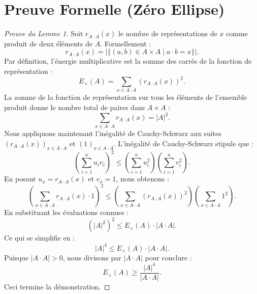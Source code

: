\documentclass[11pt,a4paper]{article}
\begin{document}
\section{Preuve Formelle (Zéro Ellipse)}
\begin{proof}[Preuve du Lemme 1]
Soit $r_{A \cdot A}(x)$ le nombre de représentations de $x$ comme produit de deux éléments de $A$. Formellement :
\begin{equation}
r_{A \cdot A}(x) = |\{(a,b) \in A \times A \mid a \cdot b = x\}|.
\end{equation}
Par définition, l'énergie multiplicative est la somme des carrés de la fonction de représentation :
\begin{equation}
E_{\times}(A) = \sum_{x \in A \cdot A} (r_{A \cdot A}(x))^2.
\end{equation}
La somme de la fonction de représentation sur tous les éléments de l'ensemble produit donne le nombre total de paires dans $A \times A$ :
\begin{equation}
\sum_{x \in A \cdot A} r_{A \cdot A}(x) = |A|^2.
\end{equation}
Nous appliquons maintenant l'inégalité de Cauchy-Schwarz aux suites $(r_{A \cdot A}(x))_{x \in A \cdot A}$ et $(1)_{x \in A \cdot A}$.
L'inégalité de Cauchy-Schwarz stipule que :
\begin{equation}
\left( \sum_{i=1}^{n} u_i v_i \right)^2 \leq \left( \sum_{i=1}^{n} u_i^2 \right) \left( \sum_{i=1}^{n} v_i^2 \right).
\end{equation}
En posant $u_x = r_{A \cdot A}(x)$ et $v_x = 1$, nous obtenons :
\begin{equation}
\left( \sum_{x \in A \cdot A} r_{A \cdot A}(x) \cdot 1 \right)^2 \leq \left( \sum_{x \in A \cdot A} (r_{A \cdot A}(x))^2 \right) \left( \sum_{x \in A \cdot A} 1^2 \right).
\end{equation}
En substituant les évaluations connues :
\begin{equation}
(|A|^2)^2 \leq E_{\times}(A) \cdot |A \cdot A|.
\end{equation}
Ce qui se simplifie en :
\begin{equation}
|A|^4 \leq E_{\times}(A) \cdot |A \cdot A|.
\end{equation}
Puisque $|A \cdot A| > 0$, nous divisons par $|A \cdot A|$ pour conclure :
\begin{equation}
E_{\times}(A) \geq \frac{|A|^4}{|A \cdot A|}.
\end{equation}
Ceci termine la démonstration.
\end{proof}
\end{document}
